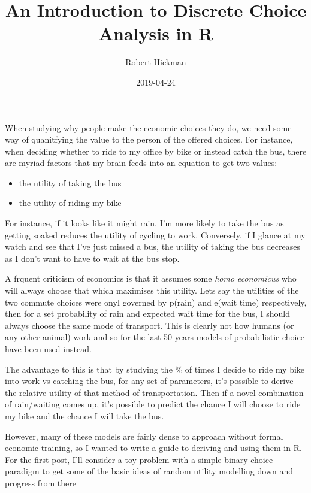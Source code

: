 \documentclass[]{article}
\title{An Introduction to Discrete Choice Analysis in R}
\author{Robert Hickman}
\date{2019-04-24}
\providecommand{\tightlist}{%
  \setlength{\itemsep}{0pt}\setlength{\parskip}{0pt}}
\begin{document}
\maketitle

When studying why people make the economic choices they do, we need some
way of quanitfying the value to the person of the offered choices. For
instance, when deciding whether to ride to my office by bike or instead
catch the bus, there are myriad factors that my brain feeds into an
equation to get two values:

\begin{itemize}
\tightlist
\item
  the utility of taking the bus
\item
  the utility of riding my bike
\end{itemize}

For instance, if it looks like it might rain, I'm more likely to take
the bus as getting soaked reduces the utility of cycling to work.
Conversely, if I glance at my watch and see that I've just missed a bus,
the utility of taking the bus decreases as I don't want to have to wait
at the bus stop.

A frquent criticism of economics is that it assumes some \emph{homo
economicus} who will always choose that which maximises this utility.
Lets say the utilities of the two commute choices were onyl governed by
p(rain) and e(wait time) respectively, then for a set probability of
rain and expected wait time for the bus, I should always choose the same
mode of transport. This is clearly not how humans (or any other animal)
work and so for the last 50 years
\href{https://eml.berkeley.edu/~mcfadden/discrete/ch5.pdf}{models of
probabilistic choice} have been used instead.

The advantage to this is that by studying the \% of times I decide to
ride my bike into work vs catching the bus, for any set of parameters,
it's possible to derive the relative utility of that method of
transportation. Then if a novel combination of rain/waiting comes up,
it's possible to predict the chance I will choose to ride my bike and
the chance I will take the bus.

However, many of these models are fairly dense to approach without
formal economic training, so I wanted to write a guide to deriving and
using them in R. For the first post, I'll consider a toy problem with a
simple binary choice paradigm to get some of the basic ideas of random
utility modelling down and progress from there
\end{document}
